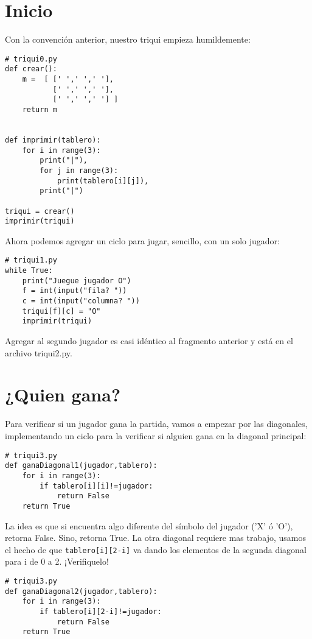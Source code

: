 \section{Inicio}

Con la convención anterior, nuestro triqui empieza humildemente:

\begin{lstlisting}
# triqui0.py
def crear():
    m =  [ [' ',' ',' '],
           [' ',' ',' '],
           [' ',' ',' '] ]
    return m


def imprimir(tablero):
    for i in range(3):
        print("|"),
        for j in range(3):
            print(tablero[i][j]),
        print("|")
        
triqui = crear()
imprimir(triqui)
\end{lstlisting}

Ahora podemos agregar un ciclo para jugar, sencillo, con un solo jugador:\pagebreak{}

\begin{lstlisting}
# triqui1.py
while True:
    print("Juegue jugador O")
    f = int(input("fila? "))
    c = int(input("columna? "))
    triqui[f][c] = "O"
    imprimir(triqui)
\end{lstlisting}

Agregar al segundo jugador es casi idéntico al fragmento anterior
y está en el archivo triqui2.py.

\section{¿Quien gana?}

Para verificar si un jugador gana la partida, vamos a empezar por
las diagonales, implementando un ciclo para la verificar si alguien
gana en la diagonal principal:

\begin{lstlisting}
# triqui3.py
def ganaDiagonal1(jugador,tablero):
    for i in range(3):
        if tablero[i][i]!=jugador:
            return False
    return True
\end{lstlisting}

La idea es que si encuentra algo diferente del símbolo del jugador
('X' ó 'O'), retorna False. Sino, retorna True. La otra diagonal requiere
mas trabajo, usamos el hecho de que \texttt{tablero{[}i{]}{[}2-i{]}}
va dando los elementos de la segunda diagonal para i de 0 a 2. ¡Verifiquelo!

\begin{lstlisting}
# triqui3.py
def ganaDiagonal2(jugador,tablero):
    for i in range(3):
        if tablero[i][2-i]!=jugador:
            return False
    return True
\end{lstlisting}

